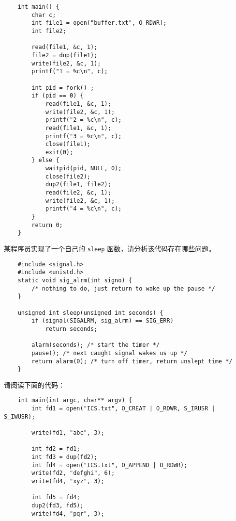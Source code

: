 \begin{problems}
\begin{verbatim}
    int main() {
        char c;
        int file1 = open("buffer.txt", O_RDWR);
        int file2;

        read(file1, &c, 1);
        file2 = dup(file1);
        write(file2, &c, 1);
        printf("1 = %c\n", c);

        int pid = fork() ;
        if (pid == 0) {
            read(file1, &c, 1);
            write(file2, &c, 1);
            printf("2 = %c\n", c);
            read(file1, &c, 1);
            printf("3 = %c\n", c);
            close(file1);
            exit(0);
        } else {
            waitpid(pid, NULL, 0);
            close(file2);
            dup2(file1, file2);
            read(file2, &c, 1);
            write(file2, &c, 1);
            printf("4 = %c\n", c);
        }
        return 0;
    }
        \end{verbatim}
         某程序员实现了一个自己的 \verb|sleep| 函数，请分析该代码存在哪些问题。
        \begin{verbatim}
    #include <signal.h>
    #include <unistd.h>
    static void sig_alrm(int signo) {
        /* nothing to do, just return to wake up the pause */
    }

    unsigned int sleep(unsigned int seconds) {
        if (signal(SIGALRM, sig_alrm) == SIG_ERR)
            return seconds;

        alarm(seconds); /* start the timer */
        pause(); /* next caught signal wakes us up */
        return alarm(0); /* turn off timer, return unslept time */
    }
        \end{verbatim}
         请阅读下面的代码：
        \begin{verbatim}
    int main(int argc, char** argv) {
        int fd1 = open("ICS.txt", O_CREAT | O_RDWR, S_IRUSR | S_IWUSR);
        
        write(fd1, "abc", 3);

        int fd2 = fd1;
        int fd3 = dup(fd2);
        int fd4 = open("ICS.txt", O_APPEND | O_RDWR);
        write(fd2, "defghi", 6);
        write(fd4, "xyz", 3);

        int fd5 = fd4;
        dup2(fd3, fd5);
        write(fd4, "pqr", 3);


\end{verbatim}
\end{problems}
